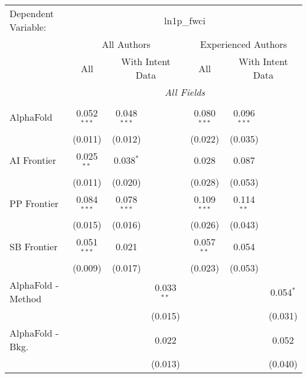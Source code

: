 \begingroup
\centering
\begin{tabular}{lcccccc}
   \tabularnewline \midrule \midrule
   Dependent Variable: & \multicolumn{6}{c}{ln1p\_fwci}\\
 & \multicolumn{3}{c}{All Authors} & \multicolumn{3}{c}{Experienced Authors} \\
\cmidrule(lr){2-4} \cmidrule(lr){5-7}
 & \multicolumn{1}{c}{All} & \multicolumn{2}{c}{With Intent Data} & \multicolumn{1}{c}{All} & \multicolumn{2}{c}{With Intent Data} \\
\cmidrule(lr){2-2} \cmidrule(lr){3-4} \cmidrule(lr){5-5} \cmidrule(lr){6-7}
 & \multicolumn{6}{c}{\textit{All Fields}} \\ \\
   AlphaFold                     & 0.052$^{***}$ & 0.048$^{***}$ &                & 0.080$^{***}$ & 0.096$^{***}$ &   \\   
                                 & (0.011)       & (0.012)       &                & (0.022)       & (0.035)       &   \\   
   AI Frontier                   & 0.025$^{**}$  & 0.038$^{*}$   &                & 0.028         & 0.087         &   \\   
                                 & (0.011)       & (0.020)       &                & (0.028)       & (0.053)       &   \\   
   PP Frontier                   & 0.084$^{***}$ & 0.078$^{***}$ &                & 0.109$^{***}$ & 0.114$^{**}$  &   \\   
                                 & (0.015)       & (0.016)       &                & (0.026)       & (0.043)       &   \\   
   SB Frontier                   & 0.051$^{***}$ & 0.021         &                & 0.057$^{**}$  & 0.054         &   \\   
                                 & (0.009)       & (0.017)       &                & (0.023)       & (0.053)       &   \\   
   AlphaFold - Method            &               &               & 0.033$^{**}$   &               &               & 0.054$^{*}$\\   
                                 &               &               & (0.015)        &               &               & (0.031)\\   
   AlphaFold - Bkg.              &               &               & 0.022          &               &               & 0.052\\   
                                 &               &               & (0.013)        &               &               & (0.040)\\   

\end{tabular}
